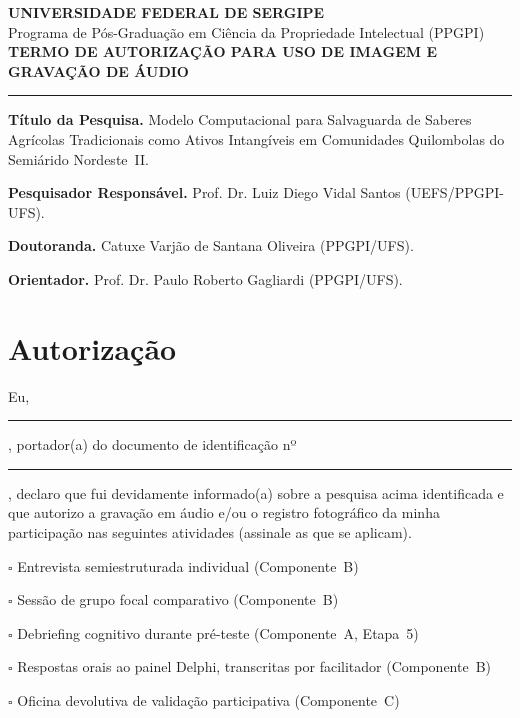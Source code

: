 \documentclass[12pt,a4paper,brazil]{article}
\begin{document}
\begin{center}
{\large\bfseries UNIVERSIDADE FEDERAL DE SERGIPE}\\[0.3cm]
{\normalsize Programa de Pós-Graduação em Ciência da Propriedade Intelectual (PPGPI)}\\[1cm]
{\Large\bfseries TERMO DE AUTORIZAÇÃO PARA USO DE IMAGEM E GRAVAÇÃO DE ÁUDIO}\\[0.5cm]
\noindent\rule{\textwidth}{0.4pt}
\end{center}

\vspace{0.5cm}

\noindent\textbf{Título da Pesquisa.} Modelo Computacional para Salvaguarda de Saberes Agrícolas Tradicionais como Ativos Intangíveis em Comunidades Quilombolas do Semiárido Nordeste~II.

\noindent\textbf{Pesquisador Responsável.} Prof. Dr. Luiz Diego Vidal Santos (UEFS/PPGPI-UFS).

\noindent\textbf{Doutoranda.} Catuxe Varjão de Santana Oliveira (PPGPI/UFS).

\noindent\textbf{Orientador.} Prof. Dr. Paulo Roberto Gagliardi (PPGPI/UFS).

\vspace{0.5cm}

\section*{Autorização}

Eu, \rule{8cm}{0.4pt}, portador(a) do documento de identificação nº~\rule{4cm}{0.4pt}, declaro que fui devidamente informado(a) sobre a pesquisa acima identificada e que autorizo a gravação em áudio e/ou o registro fotográfico da minha participação nas seguintes atividades (assinale as que se aplicam).

\vspace{0.5cm}

\noindent
$\square$ Entrevista semiestruturada individual (Componente~B)

\noindent
$\square$ Sessão de grupo focal comparativo (Componente~B)

\noindent
$\square$ Debriefing cognitivo durante pré-teste (Componente~A, Etapa~5)

\noindent
$\square$ Respostas orais ao painel Delphi, transcritas por facilitador (Componente~B)

\noindent
$\square$ Oficina devolutiva de validação participativa (Componente~C)
\end{document}
